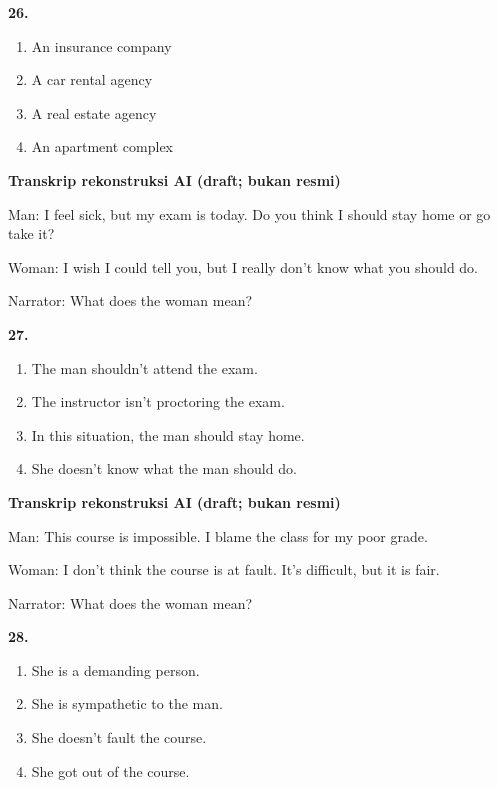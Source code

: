 \documentclass[12pt]{article}
\begin{document}
\noindent\textbf{26.}
\begin{enumerate}[label=(\Alph*),leftmargin=*,itemsep=0.2em]
\item An insurance company
\item A car rental agency
\item A real estate agency
\item An apartment complex
\end{enumerate}
\par
\vspace{0.25\baselineskip}
\begin{exampleblock}
\textbf{Transkrip rekonstruksi AI (draft; bukan resmi)}\par
Man: I feel sick, but my exam is today. Do you think I should stay home or go take it?\par
Woman: I wish I could tell you, but I really don't know what you should do.\par
Narrator: What does the woman mean?\par
\end{exampleblock}
\noindent\textbf{27.}
\begin{enumerate}[label=(\Alph*),leftmargin=*,itemsep=0.2em]
\item The man shouldn't attend the exam.
\item The instructor isn't proctoring the exam.
\item In this situation, the man should stay home.
\item She doesn't know what the man should do.
\end{enumerate}
\par
\vspace{0.25\baselineskip}
\begin{exampleblock}
\textbf{Transkrip rekonstruksi AI (draft; bukan resmi)}\par
Man: This course is impossible. I blame the class for my poor grade.\par
Woman: I don't think the course is at fault. It's difficult, but it is fair.\par
Narrator: What does the woman mean?\par
\end{exampleblock}
\noindent\textbf{28.}
\begin{enumerate}[label=(\Alph*),leftmargin=*,itemsep=0.2em]
\item She is a demanding person.
\item She is sympathetic to the man.
\item She doesn't fault the course.
\item She got out of the course.
\end{enumerate}
\end{document}
